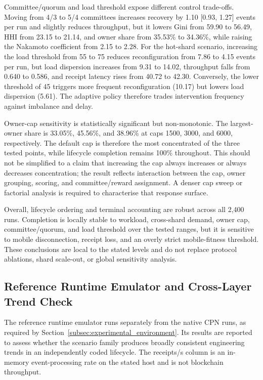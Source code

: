 \documentclass[a4paper,fleqn]{cas-sc}
\begin{document}
Committee/quorum and load threshold expose different control trade-offs.
Moving from 4/3 to 5/4 committees increases recovery by 1.10 [0.93, 1.27]
events per run and slightly reduces throughput, but it lowers Gini from 59.90
to 56.49, HHI from 23.15 to 21.14, and owner share from 35.53\% to 34.36\%,
while raising the Nakamoto coefficient from 2.15 to 2.28. For the hot-shard
scenario, increasing the load threshold from 55 to 75 reduces reconfiguration
from 7.86 to 4.15 events per run, but load dispersion increases from 9.31 to
14.02, throughput falls from 0.640 to 0.586, and receipt latency rises from
40.72 to 42.30. Conversely, the lower threshold of 45 triggers more frequent
reconfiguration (10.17) but lowers load dispersion (5.61). The adaptive policy
therefore trades intervention frequency against imbalance and delay.

Owner-cap sensitivity is statistically significant but non-monotonic. The
largest-owner share is 33.05\%, 45.56\%, and 38.96\% at caps 1500, 3000, and
6000, respectively. The default cap is therefore the most concentrated of the
three tested points, while lifecycle completion remains 100\% throughout. This
should not be simplified to a claim that increasing the cap always increases or
always decreases concentration; the result reflects interaction between the
cap, owner grouping, scoring, and committee/reward assignment. A denser cap
sweep or factorial analysis is required to characterise that response surface.

Overall, lifecycle ordering and terminal accounting are robust across all 2,400
runs. Completion is locally stable to workload, cross-shard demand, owner cap,
committee/quorum, and load threshold over the tested ranges, but it is sensitive
to mobile disconnection, receipt loss, and an overly strict mobile-fitness
threshold. These conclusions are local to the stated levels and do not replace
protocol ablations, shard scale-out, or global sensitivity analysis.


\FloatBarrier

\subsection{Reference Runtime Emulator and Cross-Layer Trend Check}
\label{subsec:implementation_results}

The reference runtime emulator runs separately from the native CPN
runs, as required by Section~\ref{subsec:experimental_environment}. Its results
are reported to assess whether the scenario family produces broadly consistent
engineering trends in an independently coded lifecycle. The receipts/s column
is an in-memory event-processing rate on the stated host and is not blockchain
throughput.
\end{document}
